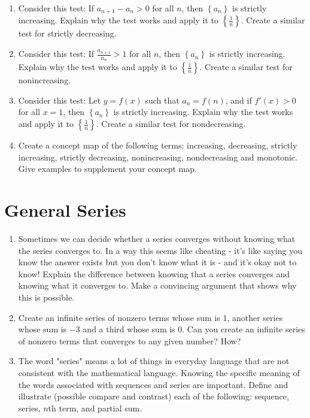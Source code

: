 \begin{enumerate}
\item Consider this test: If $a_{n + 1}  - a_n  > 0$ for all $n$, then $
\left\{ {a_n } \right\}$ is strictly increasing.  Explain why the test works and apply it to $\left\{ {\frac{1}{n}} \right\}
$.  Create a similar test for strictly decreasing.

\item Consider this test: If $
\frac{{a_{n + 1} }}{{a_n }} > 1$ for all $n$, then $\left\{ {a_n } \right\}$ is strictly increasing.  Explain why the test works and apply it to $
\left\{ {\frac{1}{n}} \right\}$.  Create a similar test for nonincreasing.

\item Consider this test: Let $y = f(x)$ such that $
a_n  = f(n)$, and if $f'\left( x \right) > 0$ for all $x = 1$, then $\left\{ {a_n } \right\}$ is strictly increasing.  Explain why the test works and apply it to $\left\{ {\frac{1}{n}} \right\}$.  Create a similar test for nondecreasing.

\item Create a concept map of the following terms:  increasing, decreasing, strictly increasing, strictly decreasing, nonincreasing, nondecreasing and monotonic.  Give examples to supplement your concept map.

\end{enumerate}\section{General Series}\begin{enumerate}

\item Sometimes we can decide whether a series converges without knowing what the series converges to.  In a way this seems like cheating - it's like saying you know the answer exists but you don't know what it is - and it's okay not to know!  Explain the difference between knowing that a series converges and knowing what it converges to.  Make a convincing argument that shows why this is possible.

\item Create an infinite series of nonzero terms whose sum is 1, another series whose sum is $-3$ and a third whose sum is 0.  Can you create an infinite series of nonzero terms that converges to any given number?  How?  \cite{FWG}

\item The word "series" means a lot of things in everyday language that are not consistent with the mathematical language.  Knowing the specific meaning of the words associated with sequences and series are important.  Define and illustrate (possible compare and contrast) each of the following:  sequence, series, $n$th term, and partial sum.


\end{enumerate}
